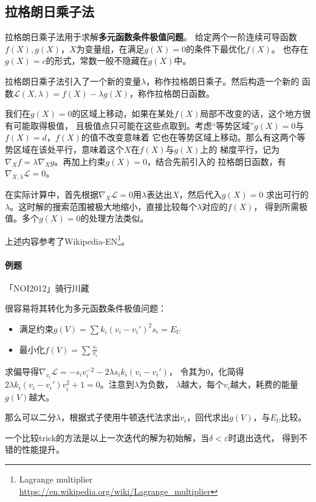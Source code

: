 \subsection{拉格朗日乘子法}
拉格朗日乘子法用于求解{\bfseries 多元函数条件极值问题}。
给定两个一阶连续可导函数$f(X),g(X)$，$X$为变量组，在满足$g(X)=0$的条件下最优化$f(X)$。
也存在$g(X)=c$的形式，常数一般不隐藏在$g(X)$中。

拉格朗日乘子法引入了一个新的变量$\lambda$，称作拉格朗日乘子。然后构造一个新的
函数$\mathcal{L}(X,\lambda)=f(X)-\lambda g(X)$，称作拉格朗日函数。

我们在$g(X)=0$的区域上移动，如果在某处$f(X)$局部不改变的话，这个地方很有可能取得极值，
且极值点只可能在这些点取到。考虑``等势区域''$g(X)=0$与$f(X)=d$，$f(X)$的值不改变意味着
它也在等势区域上移动。那么有这两个等势区域在该处平行，意味着这个$X$在$f(X)$与$g(X)$上的
梯度平行，记为$\nabla_X f=\lambda \nabla_X g$。再加上约束$g(X)=0$，结合先前引入的
拉格朗日函数，有$\nabla_{X,\lambda} \mathcal{L}=0$。

在实际计算中，首先根据$\nabla_X \mathcal{L}=0$用$\lambda$表达出$X$，然后代入$g(X)=0$
求出可行的$\lambda$。这时解的搜索范围被极大地缩小，直接比较每个$\lambda$对应的$f(X)$，
得到所需极值。多个$g(X)=0$的处理方法类似。


上述内容参考了Wikipedia-EN\footnote{
	Lagrange multiplier\\
	\url{https://en.wikipedia.org/wiki/Lagrange\_multiplier}
}。

\paragraph{例题} 「NOI2012」骑行川藏

很容易将其转化为多元函数条件极值问题：
\begin{itemize}
	\item 满足约束$\displaystyle g(V)=\sum{k_i(v_i-v_i')^2s_i}=E_U$
	\item 最小化$\displaystyle f(V)=\sum{\frac{s_i}{v_i}}$
\end{itemize}

求偏导得$\nabla_{v_i} \mathcal{L}=-s_iv_i^{-2}-2\lambda s_ik_i(v_i-v_i')$，
令其为0，化简得$2\lambda k_i(v_i-v_i')v_i^2+1=0$。注意到$\lambda$为负数，
$\lambda$越大，每个$v_i$越大，耗费的能量$g(V)$越大。

那么可以二分$\lambda$，根据式子使用牛顿迭代法求出$v_i$，回代求出$g(V)$，与$E_U$比较。

一个比较trick的方法是以上一次迭代的解为初始解，当$\delta<\varepsilon$时退出迭代，
得到不错的性能提升。

